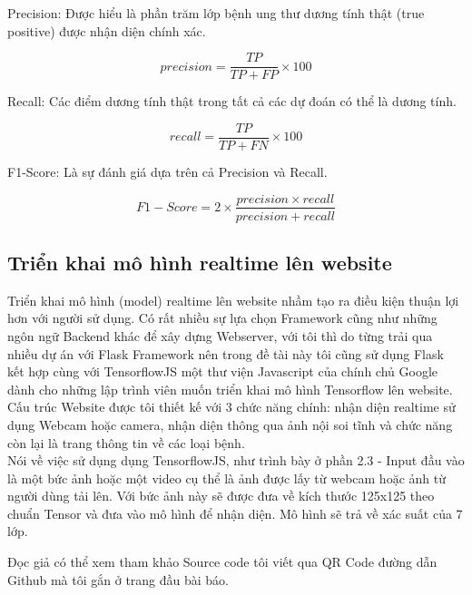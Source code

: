 \documentclass[12pt,a4paper]{article}
\begin{document}
	\noindent
	Precision: Được hiểu là phần trăm lớp bệnh ung thư dương tính thật (true positive) được nhận diện chính xác.
	
	\begin{equation}
		precision = \frac{TP}{TP + FP}\times 100
	\end{equation}

	\noindent
	Recall: Các điểm dương tính thật trong tất cả các dự đoán có thể là dương tính.
	
	\begin{equation}
		recall = \frac{TP}{TP + FN}\times 100
	\end{equation}

	\noindent
	F1-Score: Là sự đánh giá dựa trên cả Precision và Recall.
	
	\begin{equation}
		F1-Score = 2\times\frac{precision\times recall}{precision + recall}
	\end{equation}
	
	\subsection{Triển khai mô hình realtime lên website}
	Triển khai mô hình (model) realtime lên website nhầm tạo ra điều kiện thuận lợi hơn với người sử dụng. Có rất nhiều sự lựa chọn Framework cũng như những ngôn ngữ Backend khác để xây dựng Webserver, với tôi thì do từng trải qua nhiều dự án với Flask Framework nên trong đề tài này tôi cũng sử dụng Flask kết hợp cùng với TensorflowJS một thư viện Javascript của chính chủ Google dành cho những lập trình viên muốn triển khai mô hình Tensorflow lên website.\\
	
	\noindent
	Cấu trúc Website được tôi thiết kế với 3 chức năng chính: nhận diện realtime sử dụng Webcam hoặc camera, nhận diện thông qua ảnh nội soi tĩnh và chức năng còn lại là trang thông tin về các loại bệnh.\\
	
	\noindent
	Nói về việc sử dụng dụng TensorflowJS, như trình bày ở phần 2.3 - Input đầu vào là một bức ảnh hoặc một video cụ thể là ảnh được lấy từ webcam hoặc ảnh từ người dùng tải lên. Với bức ảnh này sẽ được đưa về kích thước 125x125 theo chuẩn Tensor và đưa vào mô hình để nhận diện. Mô hình sẽ trả về xác suất của 7 lớp.
	
	\noindent
	Đọc giả có thể xem tham khảo Source code tôi viết qua QR Code đường dẫn Github mà tôi gắn ở trang đầu bài báo.
	
\end{document}
